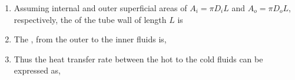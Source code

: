 \documentclass[10pt,compress,unknownkeysallowed]{beamer}
\begin{document}
\begin{frame}
\begin{columns}
\begin{column}[l]{0.5\linewidth}
\begin{enumerate}
            \item<2-> Assuming internal and outer superficial areas of $A_{i}=\pi D_{i}L$ and $A_{o}=\pi D_{o}L$, respectively, the  of the tube wall of length $L$ is
            \item<3-> The ,  from the outer to the inner fluids is,
            \item<4-> Thus the heat transfer rate between the hot to the cold fluids can be expressed as,

         \end{enumerate}
       \end{column}      
    \end{columns}
\end{frame}
\end{document}
